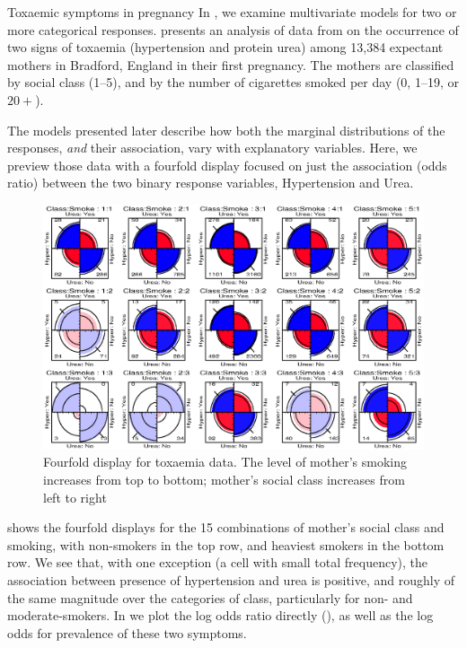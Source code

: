 \begin{Example}[toxaemia0]{Toxaemic symptoms in pregnancy}
In , we examine multivariate models
for two or more categorical responses.
 presents an analysis of data from
\citet{Brown-etal:83}
on the occurrence of two
signs of toxaemia (hypertension and protein urea)
among 13,384 expectant mothers in Bradford, England in their first pregnancy.
The mothers are classified by social class (1--5), and by the
number of cigarettes smoked per day (0, 1--19, or $20+$).

The models presented later describe how both the marginal distributions
of the responses, \emph{and} their association, vary with explanatory variables.
Here, we preview those data with a fourfold display focused on just
the association (odds ratio) between the two binary
response variables, Hypertension and Urea.


\begin{figure}[htb]
  \centering
  \includegraphics[width=\linewidth,clip]{ch3/fig/4ftox.eps}
  \caption[Fourfold display for toxaemia data]{Fourfold display for toxaemia data.  The level of mother's smoking increases from top to bottom;
  mother's social class increases from left to right}%
  \label{fig:4ftox}
\end{figure}

 shows the fourfold displays for the 15 combinations
of mother's social class and smoking, with non-smokers in the top row,
and heaviest smokers in the bottom row.
We see that, with one exception (a cell with small total frequency),
the association between presence of hypertension and urea
is positive, and roughly of the same magnitude over the categories
of class, particularly for non- and moderate-smokers.
In  we plot the log odds ratio directly (), as well as the log odds for prevalence
of these two symptoms.
\end{Example}
